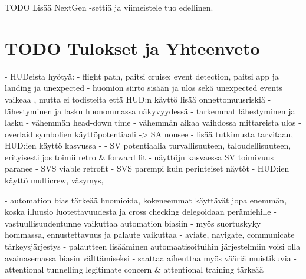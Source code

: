 \documentclass[utf8,bachelor,manualbib]{gradu3}
\begin{document}
TODO Lisää NextGen -settiä ja viimeistele tuo edellinen.

\chapter{TODO Tulokset ja Yhteenveto}

- HUDeista hyötyä:
	- flight path, paitsi cruise; event detection, paitsi app ja landing ja unexpected
	- huomion siirto sisään ja ulos sekä unexpected events vaikeaa , mutta ei todisteita että HUD:n käyttö lisää onnettomuusriskiä
	- lähestyminen ja lasku huonommassa näkyvyydessä
	- tarkemmat lähestyminen ja lasku
	- vähemmän head-down time
	- vähemmän aikaa vaihdossa mittareista ulos
	- overlaid symbolien käyttöpotentiaali -> SA nousee
	- lisää tutkimusta tarvitaan, HUD:ien käyttö kasvussa
	-  \citep{crawfordneal2006}
- SV potentiaalia turvallisuuteen, taloudellisuuteen, erityisesti jos toimii retro \& forward fit
- näyttöjn kasvaessa SV toimivuus paranee
- SVS viable retrofit \citep{prinzel2004}
- SVS parempi kuin perinteiset näytöt \citep{schnellym2004}
- HUD:ien käyttö multicrew, väsymys, \citep{crawfordneal2006}

- automation bias tärkeää huomioida, kokeneemmat käyttävät jopa enemmän, koska illuusio luotettavuudesta ja cross checking delegoidaan perämiehille
- vastuullisuudentunne vaikuttaa automation biasiin \citep{mosierym1998}
- myös suortuskyky hommassa, ennustettavuus ja palaute vaikuttaa
- aviate, navigate, communicate tärkeysjärjestys
- palautteen lisääminen automaatisoituihin järjestelmiin voisi olla avainasemassa biasin välttämiseksi
- saattaa aiheuttaa myös vääriä muistikuvia  \citep{mosierym1998}
- attentional tunnelling legitimate concern \& attentional training tärkeää \citep{wickensalexander2009}

\end{document}
